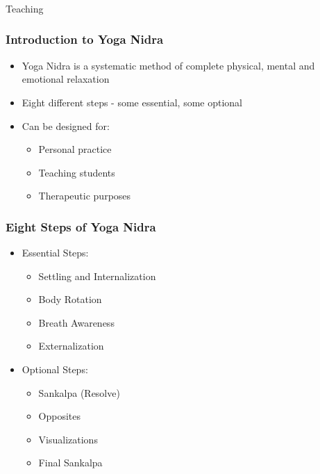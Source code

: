 \begin{frame}[fragile]\frametitle{}
\begin{center}
{\Large Teaching}
\end{center}
\end{frame}

\begin{frame}[fragile]\frametitle{Introduction to Yoga Nidra}
    \begin{itemize}
        \item Yoga Nidra is a systematic method of complete physical, mental and emotional relaxation
        \item Eight different steps - some essential, some optional
        \item Can be designed for:
            \begin{itemize}
                \item Personal practice
                \item Teaching students
                \item Therapeutic purposes
            \end{itemize}
    \end{itemize}
\end{frame}

\begin{frame}[fragile]\frametitle{Eight Steps of Yoga Nidra}
    \begin{itemize}
        \item Essential Steps:
            \begin{itemize}
                \item Settling and Internalization
                \item Body Rotation
                \item Breath Awareness
                \item Externalization
            \end{itemize}
        \item Optional Steps:
            \begin{itemize}
                \item Sankalpa (Resolve)
                \item Opposites
                \item Visualizations
                \item Final Sankalpa
            \end{itemize}
    \end{itemize}
\end{frame}


